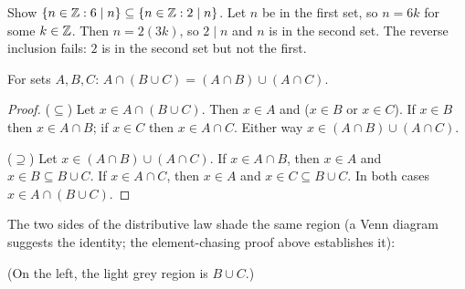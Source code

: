 \begin{example}
Show $\{n \in \mathbb{Z} : 6 \mid n\} \subseteq \{n \in \mathbb{Z} : 2 \mid n\}$.
Let $n$ be in the first set, so $n = 6k$ for some $k \in \mathbb{Z}$. Then $n = 2(3k)$, so $2 \mid n$
and $n$ is in the second set. The reverse inclusion fails: $2$ is in the second set but not
the first.
\end{example}

\begin{proposition}
For sets $A,B,C$: $A \cap (B \cup C) = (A \cap B) \cup (A \cap C)$.
\end{proposition}
\begin{proof}
($\subseteq$) Let $x \in A \cap (B\cup C)$. Then $x \in A$ and ($x \in B$ or $x \in C$).
If $x \in B$ then $x \in A \cap B$; if $x \in C$ then $x \in A\cap C$. Either way
$x \in (A\cap B)\cup(A\cap C)$.

($\supseteq$) Let $x \in (A\cap B)\cup(A \cap C)$. If $x \in A\cap B$, then $x \in A$ and
$x \in B \subseteq B \cup C$. If $x \in A \cap C$, then $x \in A$ and $x \in C \subseteq B\cup C$.
In both cases $x \in A \cap (B \cup C)$.
\end{proof}

The two sides of the distributive law shade the same region (a Venn diagram suggests the
identity; the element-chasing proof above establishes it):
\begin{center}
\end{center}
(On the left, the light grey region is $B \cup C$.)

